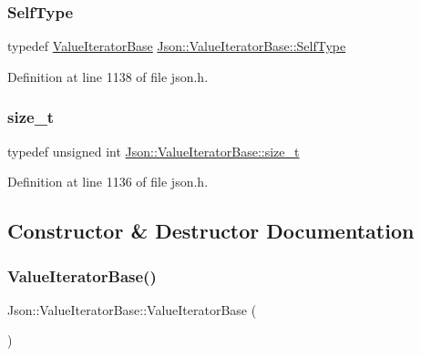 \subsubsection{\texorpdfstring{Self\+Type}{SelfType}}
{\footnotesize\ttfamily typedef \hyperlink{class_json_1_1_value_iterator_base}{Value\+Iterator\+Base} \hyperlink{class_json_1_1_value_iterator_base_a9d2a940d03ea06d20d972f41a89149ee}{Json\+::\+Value\+Iterator\+Base\+::\+Self\+Type}}



Definition at line 1138 of file json.\+h.

\mbox{\label{class_json_1_1_value_iterator_base_a9d3a3c7ce5cdefe23cb486239cf07bb5}} 
\subsubsection{\texorpdfstring{size\+\_\+t}{size\_t}}
{\footnotesize\ttfamily typedef unsigned int \hyperlink{class_json_1_1_value_iterator_base_a9d3a3c7ce5cdefe23cb486239cf07bb5}{Json\+::\+Value\+Iterator\+Base\+::size\+\_\+t}}



Definition at line 1136 of file json.\+h.



\subsection{Constructor \& Destructor Documentation}
\mbox{\label{class_json_1_1_value_iterator_base_af45b028d9ff9cbd2554a87878b42dd75}} 
\subsubsection{\texorpdfstring{Value\+Iterator\+Base()}{ValueIteratorBase()}\hspace{0.1cm}{\footnotesize\ttfamily [1/2]}}
{\footnotesize\ttfamily Json\+::\+Value\+Iterator\+Base\+::\+Value\+Iterator\+Base (\begin{DoxyParamCaption}{ }\end{DoxyParamCaption})}



